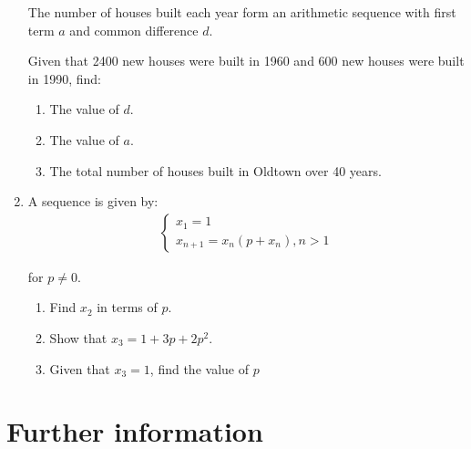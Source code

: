 \begin{enumerate}
The number of houses built each year form an arithmetic sequence with first term \(a\) and common difference \(d\).


Given that 2400 new houses were built in 1960 and 600 new houses were built in 1990, find:
\begin{enumerate}

\item 

The value of \(d\).

\item 

The value of \(a\).

\item 

The total number of houses built in Oldtown over 40 years.

\end{enumerate}

\item 

A sequence is given by:
\begin{equation*}
\begin{split}
       \left\{\begin{array}{l}
       x_1 = 1\\
       x_{n + 1}= x_n(p + x_n), n > 1
       \end{array}\right.
   \end{split}
\end{equation*}

for \(p\ne0\).
\begin{enumerate}

\item 

Find \(x_2\) in terms of \(p\).

\item 

Show that \(x_3=1+3p+2p^2\).

\item 

Given that \(x_3=1\), find the value of \(p\)

\end{enumerate}

\end{enumerate}

\section{Further information}
\label{\detokenize{tools-for-mathematics/07-sequences/why/main:further-information}}\label{\detokenize{tools-for-mathematics/07-sequences/why/main::doc}}

